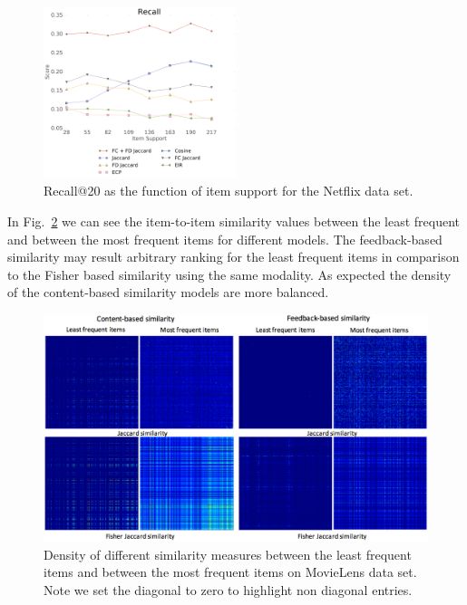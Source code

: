 \begin{figure}
\centerline{
  \includegraphics[width=0.5\textwidth]{nf_new.pdf}}
\caption[]{Recall@20 as the function of item support for the Netflix data set.
}
\label{fig:supp_netf}
\end{figure}

In Fig.~\ref{fig:sparsity} we can see the item-to-item similarity values between the least frequent and between the most frequent items for different models. The feedback-based similarity may result arbitrary 
ranking for the least frequent items in comparison to the Fisher based similarity using the same modality. As expected the density of the content-based similarity models are more balanced. 

\begin{figure}
\centerline{
  \includegraphics[scale=.21]{Sparsity.png}}
\caption[]{Density of different similarity measures between the least frequent items and between the most frequent items on MovieLens data set. Note we set the diagonal to zero to highlight non diagonal entries.}
\label{fig:sparsity}
\end{figure}

